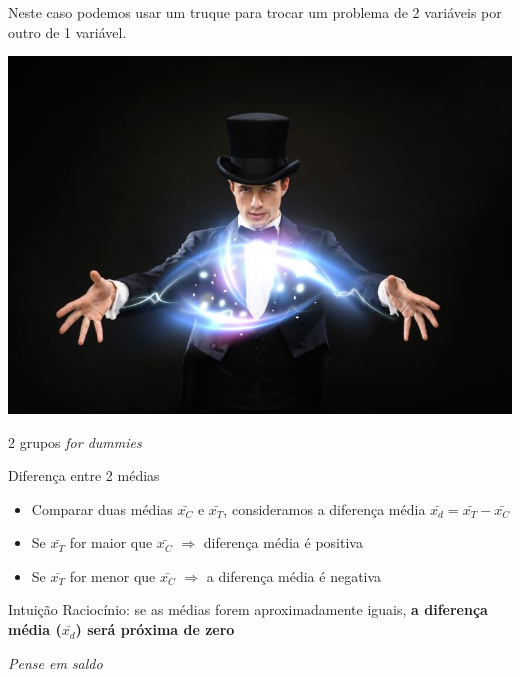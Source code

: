 \documentclass{beamer}
\begin{document}
\begin{frame}{\scriptsize }
  \begin{block}{}
    \large
    Neste caso podemos usar um truque para \alert{trocar} um problema de 2 variáveis por outro de 1 variável.
  \end{block}
  \bigskip
  \bigskip
  \begin{center}
    \includegraphics[width=.6\textwidth]{Cap7/magic}
  \end{center}
\end{frame}

\begin{frame}{\scriptsize 2 grupos {\em for dummies} \textregistered}
  \begin{block}{Diferença entre 2 médias}
    \begin{itemize}
      \scriptsize
    \item Comparar duas médias $\bar{x_C}$ e $\bar{x_T}$, consideramos a diferença média $\bar{x_d} = \bar{x_T} - \bar{x_C}$
    \item<2-> Se $\bar{x_T}$ for maior que $\bar{x_C}$  $\Rightarrow$ diferença média é positiva
    \item<2-> Se $\bar{x_T}$ for menor que $\bar{x_C}$  $\Rightarrow$ a diferença média é negativa
    \end{itemize}
  \end{block}
  \begin{block}{Intuição}
    Raciocínio: se as médias forem aproximadamente iguais, {\bf a
    diferença média ($\bar{x_d}$) será próxima de zero}
  \end{block}
  \bigskip
  \begin{center}
    {\em Pense em \alert{saldo}}
    \footnotesize
  \end{center}
\end{frame}
\end{document}
